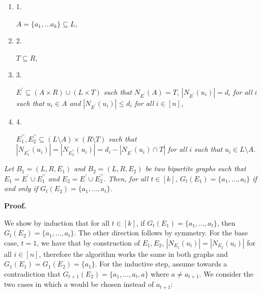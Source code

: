 \documentclass[10pt,a4paper]{article}
\begin{document}
\begin{enumerate}


\item[] 1. 


$A=\{a_{1},\ldots a_{k}\}\subseteq L$\emph{,}\par




\item[] 2. 


$T\subseteq R$\emph{,}\par




\item[] 3. 


$E^{\prime}\subseteq(A\times R)\cup(L\times T)$\emph{ such that }$N_{E^{\prime}}(A)=T$\emph{, }$|N_{E^{\prime}}(u_{i})|=d_{i}$\emph{ for all }$i$\emph{ such that }$u_{i}\in A$\emph{ and }$|N_{E^{\prime}}(u_{i})|\leq d_{i}$\emph{ for all }$i\in[n]$\emph{,}\par




\item[] 4. 


$E_{1}^{\prime\prime},E_{2}^{\prime\prime}\subseteq(L\setminus A)\times(R\setminus T)$\emph{ such that }$|N_{E^{\prime\prime}_{1}}(u_{i})|=|N_{E^{\prime\prime}_{2}}(u_{i})|=d_{i}-|N_{E^{\prime}}(u_{i})\cap T|$\emph{ for all }$i$\emph{ such that }$u_{i}\in L\setminus A$\emph{.}\par




\end{enumerate}


\emph{Let $B_{1}=(L,R,E_{1})$ and $B_{2}=(L,R,E_{2})$ be two bipartite graphs such that
$E_{1}=E^{\prime}\cup E^{\prime\prime}_{1}$ and $E_{2}=E^{\prime}\cup E^{\prime\prime}_{2}$.
Then, for all $t\in[k]$, $G_{t}(E_{1})=\{a_{1},\ldots,a_{t}\}$ if and only if $G_{t}(E_{2})=\{a_{1},\ldots,a_{t}\}$.}\par






\par\medskip\noindent\textbf{Proof.}\par



We show by induction that for all $t\in[k]$, if $G_{t}(E_{1})=\{a_{1},\dots,a_{t}\}$, then $G_{t}(E_{2})=\{a_{1},\dots,a_{t}\}$. The other direction follows by symmetry.
For the base case, $t=1$, we have that by construction of $E_{1},E_{2}$, $|N_{E_{1}}(u_{i})|=|N_{E_{2}}(u_{i})|$ for all $i\in[n]$, therefore the algorithm works the same in both graphs and $G_{1}(E_{1})=G_{1}(E_{2})=\{a_{1}\}$.
For the inductive step, assume towards a contradiction that $G_{t+1}(E_{2})=\{a_{1},\dots,a_{t},a\}$ where $a\neq a_{t+1}$.
We consider the two cases in which $a$ would be chosen instead of $a_{t+1}$:\par
\end{document}
